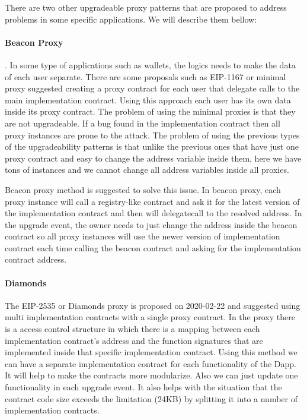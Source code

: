 There are two other upgradeable proxy patterns that are proposed to address problems in some specific applications. We will describe them bellow: 

\paragraph{Beacon Proxy}. 
In some type of applications such as wallets, the logics needs to make the data of each user separate. There are some proposals such as EIP-1167 or minimal proxy suggested creating a proxy contract for each user that delegate calls to the main implementation contract. Using this approach each user has its own data inside its proxy contract. The problem of using the minimal proxies is that they are not upgradeable. If a bug found in the implementation contract then all proxy instances are prone to the attack. The problem of using the previous types of the upgradeability patterns is that unlike the previous ones that have just one proxy contract and easy to change the address variable inside them, here we have tons of instances and we cannot change all address variables inside all proxies. 

Beacon proxy method is suggested to solve this issue. In beacon proxy, each proxy instance will call a registry-like contract and ask it for the latest version of the implementation contract and then will delegatecall to the resolved address. In the upgrade event, the owner needs to just change the address inside the beacon contract so all proxy instances will use the newer version of implementation contract each time calling the beacon contract and asking for the implementation contract address.

\paragraph{Diamonds}
The EIP-2535 or Diamonds proxy is proposed on 2020-02-22 and suggested using multi implementation contracts with a single proxy contract. In the proxy there is a access control structure in which there is a mapping between each implementation contract's address and the function signatures that are implemented inside that specific implementation contract. Using this method we can have a separate implementation contract for each functionality of the Dapp. It will help to make the contracts more modularize. Also we can just update one functionality in each upgrade event. It also helps with the situation that the contract code size exceeds the limitation (24KB) by splitting it into a number of implementation contracts.

